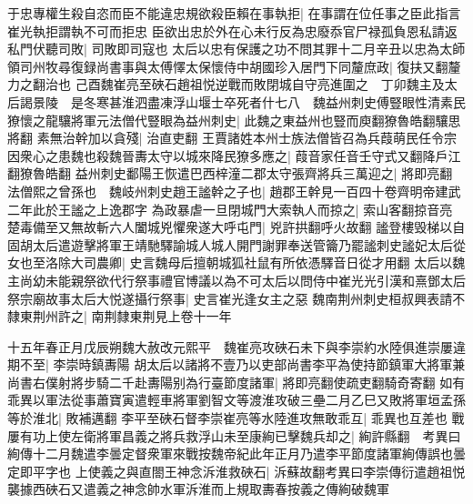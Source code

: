 于忠專權生殺自恣而臣不能違忠規欲殺臣賴在事執拒|{
	在事謂在位任事之臣此指言崔光執拒謂執不可而拒忠}
臣欲出忠於外在心未行反為忠廢忝官尸禄孤負恩私請返私門伏聽司敗|{
	司敗即司寇也}
太后以忠有保護之功不問其罪十二月辛丑以忠為太師領司州牧尋復録尚書事與太傅懌太保懷侍中胡國珍入居門下同釐庶政|{
	復扶又翻釐力之翻治也}
己酉魏崔亮至硤石趙祖悦逆戰而敗閉城自守亮進圍之　丁卯魏主及太后謁景陵　是冬寒甚淮泗盡凍浮山堰士卒死者什七八　魏益州刺史傅豎眼性清素民獠懷之龍驤將軍元法僧代豎眼為益州刺史|{
	此魏之東益州也豎而庾翻獠魯皓翻驤思將翻}
素無治幹加以貪殘|{
	治直吏翻}
王賈諸姓本州士族法僧皆召為兵葭萌民任令宗因衆心之患魏也殺魏晉夀太守以城來降民獠多應之|{
	葭音家任音壬守式又翻降戶江翻獠魯皓翻}
益州刺史鄱陽王恢遣巴西梓潼二郡太守張齊將兵三萬迎之|{
	將即亮翻}
法僧熙之曾孫也　魏岐州刺史趙王謐幹之子也|{
	趙郡王幹見一百四十卷齊明帝建武二年此於王謐之上逸郡字}
為政暴虐一旦閉城門大索執人而掠之|{
	索山客翻掠音亮}
楚毒備至又無故斬六人闔城兇懼衆遂大呼屯門|{
	兇許拱翻呼火故翻}
謐登樓毁梯以自固胡太后遣遊擊將軍王靖馳驛諭城人城人開門謝罪奉送管籥乃罷謐刺史謐妃太后從女也至洛除大司農卿|{
	史言魏母后擅朝城狐社鼠有所依憑驛音日從才用翻}
太后以魏主尚幼未能親祭欲代行祭事禮官博議以為不可太后以問侍中崔光光引漢和熹鄧太后祭宗廟故事太后大悦遂攝行祭事|{
	史言崔光逢女主之惡}
魏南荆州刺史桓叔興表請不隸東荆州許之|{
	南荆隸東荆見上卷十一年}


十五年春正月戊辰朔魏大赦改元熙平　魏崔亮攻硤石未下與李崇約水陸俱進崇屢違期不至|{
	李崇時鎮夀陽}
胡太后以諸將不壹乃以吏部尚書李平為使持節鎮軍大將軍兼尚書右僕射將步騎二千赴夀陽别為行臺節度諸軍|{
	將即亮翻使疏吏翻騎奇寄翻}
如有乖異以軍法從事蕭寶寅遣輕車將軍劉智文等渡淮攻破三壘二月乙巳又敗將軍垣孟孫等於淮北|{
	敗補邁翻}
李平至硤石督李崇崔亮等水陸進攻無敢乖互|{
	乖異也互差也}
戰屢有功上使左衛將軍昌義之將兵救浮山未至康絢已擊魏兵却之|{
	絢許縣翻　考異曰絢傳十二月魏遣李曇定督衆軍來戰按魏帝紀此年正月乃遣李平節度諸軍絢傳誤也曇定即平字也}
上使義之與直閤王神念泝淮救硤石|{
	泝蘇故翻考異曰李崇傳衍遣趙祖悦襲據西硤石又遣義之神念帥水軍泝淮而上規取夀春按義之傳絢破魏軍}


